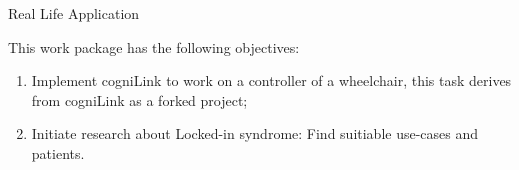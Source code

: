 
\begin{workpackage}{Real Life Application}
  \label{wp:app} %




  \makewptable %
    
  \begin{wpobjectives}
    This work package has the following objectives:
    \begin{enumerate}
    \item Implement cogniLink to work on a controller of a wheelchair, this task derives from cogniLink as a forked project;
    \item Initiate research about Locked-in syndrome: Find suitiable use-cases and patients.
    \end{enumerate}
  \end{wpobjectives}

  \begin{wpdescription}
 
  \end{wpdescription}
  
  \begin{wpdeliverables}


\end{wpdeliverables}
\end{workpackage}
